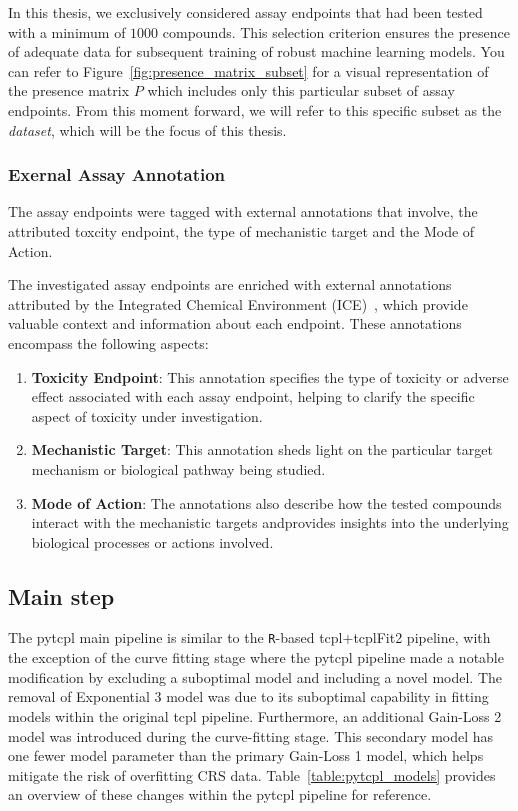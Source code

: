 In this thesis, we exclusively considered assay endpoints that had been tested with a minimum of $\num{1000}$ compounds. This selection criterion ensures the presence of adequate data for subsequent training of robust machine learning models. You can refer to Figure~\ref{fig:presence_matrix_subset} for a visual representation of the presence matrix $P$ which includes only this particular subset of assay endpoints. From this moment forward, we will refer to this specific subset as the \emph{dataset}, which will be the focus of this thesis. 

\subsubsection{Exernal Assay Annotation}
The assay endpoints were tagged with external annotations that involve, the attributed toxcity endpoint, the type of mechanistic target and the Mode of Action.

The investigated assay endpoints are enriched with external annotations attributed by the Integrated Chemical Environment (ICE)~\cite{ice2022}, which provide valuable context and information about each endpoint. These annotations encompass the following aspects:

\begin{enumerate}
    \item \textbf{Toxicity Endpoint}: This annotation specifies the type of toxicity or adverse effect associated with each assay endpoint, helping to clarify the specific aspect of toxicity under investigation.
    
    \item \textbf{Mechanistic Target}: This annotation sheds light on the particular target mechanism or biological pathway being studied.
    
    \item \textbf{Mode of Action}: The annotations also describe how the tested compounds interact with the mechanistic targets andprovides insights into the underlying biological processes or actions involved.
\end{enumerate}

\subsection{Main step}
The pytcpl main pipeline is similar to the \texttt{R}-based tcpl+tcplFit2 pipeline, with the exception of the curve fitting stage where the pytcpl pipeline made a notable modification by excluding a suboptimal model and including a novel model. The removal of Exponential 3 model was due to its suboptimal capability in fitting models within the original tcpl pipeline. Furthermore, an additional Gain-Loss 2 model was introduced during the curve-fitting stage. This secondary model has one fewer model parameter than the primary Gain-Loss 1 model, which helps mitigate the risk of overfitting CRS data. Table~\ref{table:pytcpl_models} provides an overview of these changes within the pytcpl pipeline for reference.

